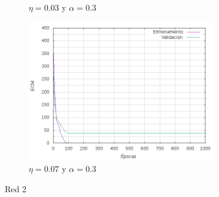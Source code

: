 \begin{figure}[H]
\begin{subfigure}[b]{0.45\textwidth}
	  \caption{$\eta = 0.03 $ y $ \alpha = 0.3$}
	\end{subfigure}
	\begin{subfigure}[b]{0.45\textwidth}
	  \includegraphics[width=0.9\textwidth]{imagenes/ej1/ex_2-4_red_11-21-1_errors.png}
	  \caption{$\eta = 0.07 $ y $ \alpha = 0.3$}
	\end{subfigure}
	\caption{Red 2}
\end{figure}

